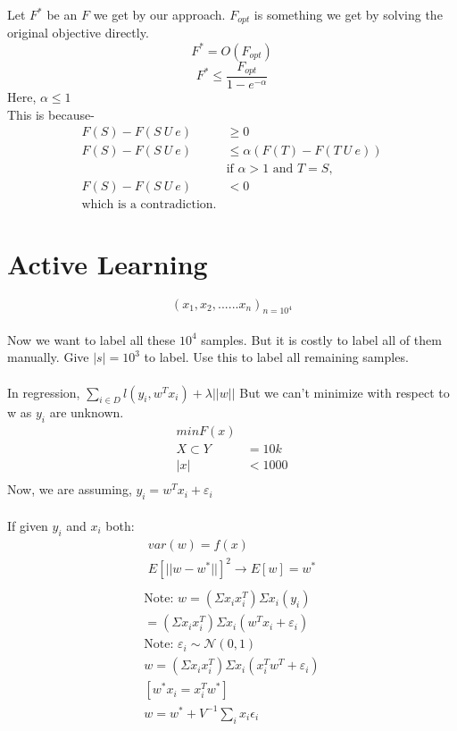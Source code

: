 \documentclass[11pt, twosides]{article}
\begin{document}
Let $F^*$ be an $F$ we get by our approach. $F_{opt}$ is something we get by solving the original objective directly.\\
$$F^* = O(F_{opt})$$
$$F^* \leq \frac{F_{opt}}{1-e^{-\alpha}}$$
Here, $\alpha \leq 1$\\
This is because-\\
\begin{align*}
    F(S) - F(S\ U\ e) &\geq 0\\
    F(S) - F(S\ U\ e) &\leq \alpha(F(T)-F(T\ U \ e))\\
    &\mbox{if $\alpha > 1$ and $T=S$,}\\
     F(S) - F(S\ U\ e) &< 0\\
     \mbox{which is a contradiction.}
\end{align*}

\section{Active Learning}
\[(x_1, x_2, ...... x_n)_{n = 10^4}\] \\
Now we want to label all these \(10^4\) samples. But it is costly to label all of them manually. Give \(|s| = 10^3\) to label. Use this to label all remaining samples.\\\\
In regression, \(\sum \limits_{i \in D} l(y_i, w^Tx_i) + \lambda ||w||\) But we can't minimize with respect to w as \(y_i\) are unknown.\\
\begin{align*}
    min F(x)&    \\
X \subset Y &= 10k\\
|x| &< 1000\\
\end{align*}
Now, we are assuming, \(y_i = w^Tx_i + \varepsilon _i\) \\\\
If given \(y_i\) and \(x_i\) both:
\begin{align*}
    var(w) = f(x)\\
    E[||w-w^*||]^2 \longrightarrow E[w] = w^*\\
\end{align*}
\begin{align*}
    \mbox{Note: } w = (\Sigma x_ix_i^T)\Sigma x_i(y_i) \\
= (\Sigma x_ix_i^T)\Sigma x_i(w^Tx_i + \varepsilon _i) \\
\mbox{Note: } \varepsilon_i \sim \mathcal{N}(0,1) \\
w = (\Sigma x_ix_i^T)\Sigma x_i(x_i^Tw^T + \varepsilon _i)\\
[w^*x_i = x_i^Tw^*]\\
w = w^* + V^{-1} \sum_i x_i \epsilon_i
\end{align*}
\end{document}
